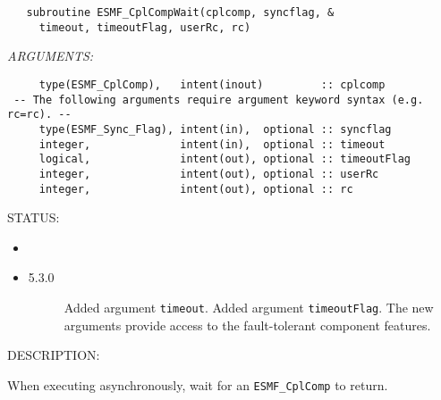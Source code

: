   
\begin{verbatim}   subroutine ESMF_CplCompWait(cplcomp, syncflag, &
     timeout, timeoutFlag, userRc, rc)\end{verbatim}{\em ARGUMENTS:}
\begin{verbatim}     type(ESMF_CplComp),   intent(inout)         :: cplcomp
 -- The following arguments require argument keyword syntax (e.g. rc=rc). --
     type(ESMF_Sync_Flag), intent(in),  optional :: syncflag
     integer,              intent(in),  optional :: timeout
     logical,              intent(out), optional :: timeoutFlag
     integer,              intent(out), optional :: userRc
     integer,              intent(out), optional :: rc\end{verbatim}
{\sf STATUS:}
   \begin{itemize}
   \item{}
   \item{}
   \begin{description}
   \item[5.3.0] Added argument {\tt timeout}.
                Added argument {\tt timeoutFlag}.
                The new arguments provide access to the fault-tolerant component
                features.
   \end{description}
   \end{itemize}
  
{\sf DESCRIPTION:\\ }


   When executing asynchronously, wait for an {\tt ESMF\_CplComp} to return.
  
